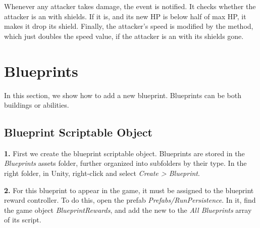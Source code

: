 Whenever any attacker takes damage, the  event is notified.
It checks whether the attacker is an  with shields.
If it is, and its new HP is below half of max HP, it makes it drop its shield.
Finally, the attacker's speed is modified by the  method, which just doubles the speed value, if the attacker is an  with its shields gone.

\section{Blueprints}

In this section, we show how to add a new blueprint.
Blueprints can be both buildings or abilities.

\subsection{Blueprint Scriptable Object}

\textbf{1.}
First we create the blueprint scriptable object.
Blueprints are stored in the \emph{Blueprints} assets folder, further organized into subfolders by their type.
In the right folder, in Unity, right-click and select \emph{Create > Blueprint}.

\textbf{2.}
For this blueprint to appear in the game, it must be assigned to the blueprint reward controller.
To do this, open the prefab \emph{Prefabs/RunPersistence}.
In it, find the game object \emph{BlueprintRewards}, and add the new  to the \emph{All Blueprints} array of its  script.

